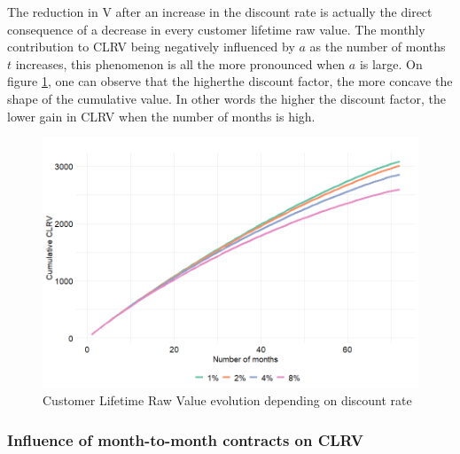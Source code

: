 \documentclass[
]{book}
\begin{document}
The reduction in V after an increase in the discount rate is actually the direct consequence of a decrease in every customer lifetime raw value. The monthly contribution to CLRV being negatively influenced by \(a\) as the number of months \(t\) increases, this phenomenon is all the more pronounced when \(a\) is large. On figure \ref{fig:clrvEvolDiscount}, one can observe that the higherthe discount factor, the more concave the shape of the cumulative value. In other words the higher the discount factor, the lower gain in CLRV when the number of months is high.

\begin{figure}

{\centering \includegraphics[width=12.5in]{./imgs/clrv_evolution_discount} 

}

\caption{Customer Lifetime Raw Value evolution depending on discount rate}\label{fig:clrvEvolDiscount}
\end{figure}

\hypertarget{influence-of-month-to-month-contracts-on-clrv}{%
\subsubsection*{Influence of month-to-month contracts on CLRV}\label{influence-of-month-to-month-contracts-on-clrv}}
\end{document}
